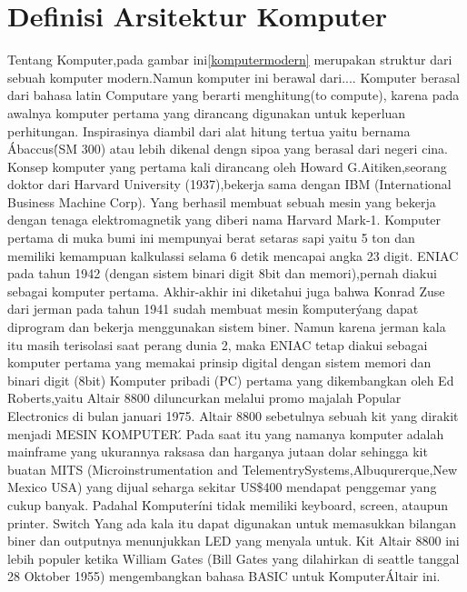 	\section{Definisi Arsitektur Komputer}
	Tentang Komputer,pada gambar ini\ref{komputermodern} merupakan struktur dari sebuah komputer modern.Namun komputer ini berawal dari.... 
	Komputer berasal dari bahasa latin Computare yang berarti menghitung(to compute), karena pada awalnya komputer pertama yang dirancang digunakan untuk keperluan perhitungan. 
	Inspirasinya diambil dari alat hitung tertua yaitu bernama \'Abaccus\'(SM 300) atau lebih dikenal dengn sipoa yang berasal dari negeri cina.
	Konsep komputer yang pertama kali dirancang oleh Howard G.Aitiken,seorang doktor dari Harvard University (1937),bekerja sama dengan IBM (International Business Machine Corp). 
	Yang berhasil membuat sebuah mesin yang bekerja dengan tenaga elektromagnetik yang diberi nama Harvard Mark-1. 
	Komputer pertama di muka bumi ini mempunyai berat setaras sapi yaitu 5 ton dan memiliki kemampuan kalkulassi selama 6 detik mencapai angka 23 digit.
	ENIAC pada tahun 1942 (dengan sistem binari digit 8bit dan memori),pernah diakui sebagai komputer pertama. 
	Akhir-akhir ini diketahui juga bahwa Konrad Zuse dari jerman pada tahun 1941 sudah membuat mesin \'komputer\' yang dapat diprogram dan bekerja menggunakan sistem biner. 
	Namun karena jerman kala itu masih terisolasi saat perang dunia 2, maka ENIAC tetap diakui sebagai 
	komputer pertama yang memakai prinsip digital dengan sistem memori dan binari digit (8bit)
	Komputer pribadi (PC) pertama yang dikembangkan oleh Ed Roberts,yaitu Altair 8800 diluncurkan melalui promo majalah Popular Electronics di bulan januari 1975.
	Altair 8800 sebetulnya sebuah kit yang dirakit menjadi \'MESIN KOMPUTER\'. 
	Pada saat itu yang namanya komputer adalah mainframe yang ukurannya raksasa dan harganya jutaan dolar sehingga kit buatan MITS (Microinstrumentation and TelementrySystems,Albuqurerque,New Mexico USA) yang dijual seharga sekitar US\$400 mendapat penggemar yang cukup banyak.
	Padahal \'Komputer\' ini tidak memiliki keyboard, screen, ataupun printer. 
	Switch Yang ada kala itu dapat digunakan untuk memasukkan bilangan biner dan outputnya menunjukkan LED yang menyala untuk.
	Kit Altair 8800 ini lebih populer ketika William Gates (Bill Gates yang dilahirkan di seattle tanggal 28 Oktober 1955) mengembangkan bahasa BASIC untuk \'Komputer\' Altair ini. 
